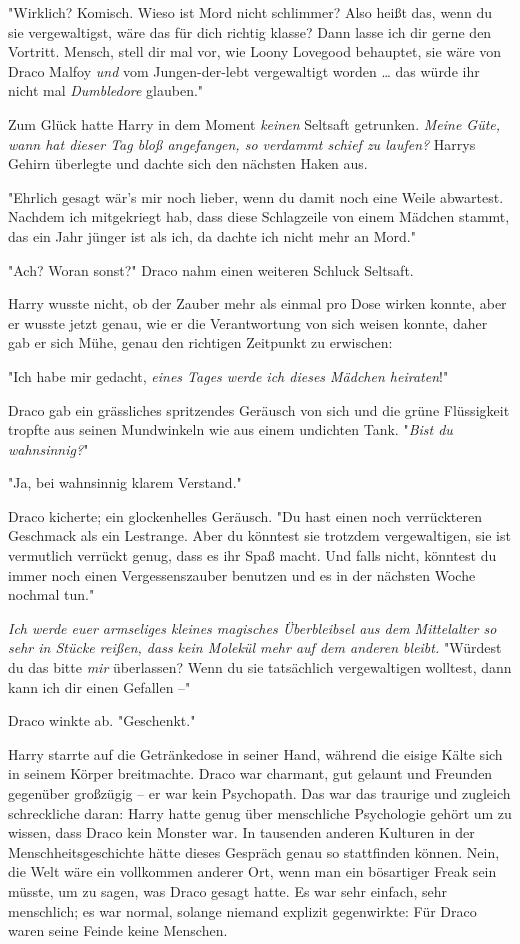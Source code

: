 {"Wirklich? Komisch. Wieso ist Mord nicht schlimmer? Also heißt das, wenn du sie vergewaltigst, wäre das für dich richtig klasse? Dann lasse ich dir gerne den Vortritt. Mensch, stell dir mal vor, wie Loony Lovegood behauptet, sie wäre von Draco Malfoy \emph{und} vom Jungen-der-lebt vergewaltigt worden … das würde ihr nicht mal \emph{Dumbledore} glauben."

Zum Glück hatte Harry in dem Moment \emph{keinen} Seltsaft getrunken. \emph{Meine Güte, wann hat dieser Tag bloß angefangen, so verdammt schief zu laufen?} Harrys Gehirn überlegte und dachte sich den nächsten Haken aus.

"Ehrlich gesagt wär's mir noch lieber, wenn du damit noch eine Weile abwartest. Nachdem ich mitgekriegt hab, dass diese Schlagzeile von einem Mädchen stammt, das ein Jahr jünger ist als ich, da dachte ich nicht mehr an Mord."

"Ach? Woran sonst?" Draco nahm einen weiteren Schluck Seltsaft.

Harry wusste nicht, ob der Zauber mehr als einmal pro Dose wirken konnte, aber er wusste jetzt genau, wie er die Verantwortung von sich weisen konnte, daher gab er sich Mühe, genau den richtigen Zeitpunkt zu erwischen:

"Ich habe mir gedacht, \emph{eines Tages werde ich dieses Mädchen heiraten}!"

Draco gab ein grässliches spritzendes Geräusch von sich und die grüne Flüssigkeit tropfte aus seinen Mundwinkeln wie aus einem undichten Tank. "\emph{Bist du wahnsinnig?}"

"Ja, bei wahnsinnig klarem Verstand."

Draco kicherte; ein glockenhelles Geräusch. "Du hast einen noch verrückteren Geschmack als ein Lestrange. Aber du könntest sie trotzdem vergewaltigen, sie ist vermutlich verrückt genug, dass es ihr Spaß macht. Und falls nicht, könntest du immer noch einen Vergessenszauber benutzen und es in der nächsten Woche nochmal tun."

\emph{Ich werde euer armseliges kleines magisches Überbleibsel aus dem Mittelalter so sehr in Stücke reißen, dass kein Molekül mehr auf dem anderen bleibt.} "Würdest du das bitte \emph{mir} überlassen? Wenn du sie tatsächlich vergewaltigen wolltest, dann kann ich dir einen Gefallen --"

Draco winkte ab. "Geschenkt."

Harry starrte auf die Getränkedose in seiner Hand, während die eisige Kälte sich in seinem Körper breitmachte. Draco war charmant, gut gelaunt und Freunden gegenüber großzügig -- er war kein Psychopath. Das war das traurige und zugleich schreckliche daran: Harry hatte genug über menschliche Psychologie gehört um zu wissen, dass Draco kein Monster war. In tausenden anderen Kulturen in der Menschheitsgeschichte hätte dieses Gespräch genau so stattfinden können. Nein, die Welt wäre ein vollkommen anderer Ort, wenn man ein bösartiger Freak sein müsste, um zu sagen, was Draco gesagt hatte. Es war sehr einfach, sehr menschlich; es war normal, solange niemand explizit gegenwirkte: Für Draco waren seine Feinde keine Menschen.

}
